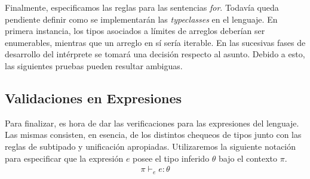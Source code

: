 \documentclass{article}
\begin{document}
Finalmente, especificamos las reglas para las sentencias \textit{for}.
Todavía queda pendiente definir como se implementarán las \textit{typeclasses} en el lenguaje.
En primera instancia, los tipos asociados a límites de arreglos deberían ser enumerables, mientras que un arreglo en sí sería iterable.
En las sucesivas fases de desarrollo del intérprete se tomará una decisión respecto al asunto.
Debido a esto, las siguientes pruebas pueden resultar ambiguas.

\begin{prooftree}
\end{prooftree}

\begin{prooftree}
\end{prooftree}

\begin{prooftree}
\end{prooftree}

\subsection{Validaciones en Expresiones}

Para finalizar, es hora de dar las verificaciones para las expresiones del lenguaje.
Las mismas consisten, en esencia, de los distintos chequeos de tipos junto con las reglas de subtipado y unificación apropiadas.
Utilizaremos la siguiente notación para especificar que la expresión $e$ posee el tipo inferido $\theta$ bajo el contexto $\pi$.
\begin{gather*}
\pi \vdash_e e : \theta
\end{gather*}
\end{document}
